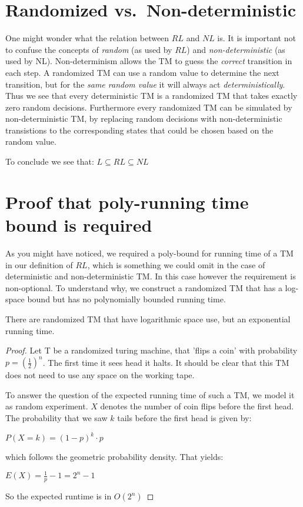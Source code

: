 \section{Randomized
vs.~Non-deterministic}\label{randomized-vs.non-deterministic}

One might wonder what the relation between $RL$ and $NL$ is. It is
important not to confuse the concepts of \emph{random} (as used by $RL$)
and \emph{non-deterministic} (as used by NL). Non-determinism allows the
TM to guess the \emph{correct} transition in each step. A randomized TM
can use a random value to determine the next transition, but for the
\emph{same random value} it will always act \emph{deterministically}.
Thus we see that every deterministic TM is a randomized TM that takes
exactly zero random decisions. Furthermore every randomized TM can be
simulated by non-deterministic TM, by replacing random decisions with
non-deterministic transistions to the corresponding states that could be
chosen based on the random value.

To conclude we see that: $L \subseteq RL \subseteq NL$

\section{Proof that poly-running time bound is
required}\label{proof-that-poly-running-time-bound-is-required}

As you might have noticed, we required a poly-bound for running time of
a TM in our definition of $RL$, which is something we could omit in the
case of deterministic and non-deterministic TM. In this case however the
requirement is non-optional. To understand why, we construct a
randomized TM that has a log-space bound but has no polynomially bounded
running time.

\vspace{0.5cm}

\begin{thm}
\label{randomized-poly-runtime}
There are randomized TM that have logarithmic space use, but an exponential running time.
\end{thm}

\begin{proof}
Let T be a randomized turing machine, that 'flips a coin' with probability $p = {\left(\frac{1}{2}\right)}^n$.
The first time it sees head it halts. It should be clear that this TM does not need to use any space on the working tape.

To answer the question of the expected running time of such a TM, we model it as random experiment.
$X$ denotes the number of coin flips before the first head. The probability that we saw $k$ tails before the first head is given by:

$P(X = k) = (1-p)^k \cdot p$

which follows the geometric probability density. That yields:

$E(X) = \frac{1}{p} - 1 = 2^n - 1$

So the expected runtime is in $O(2^n)$
\end{proof}

